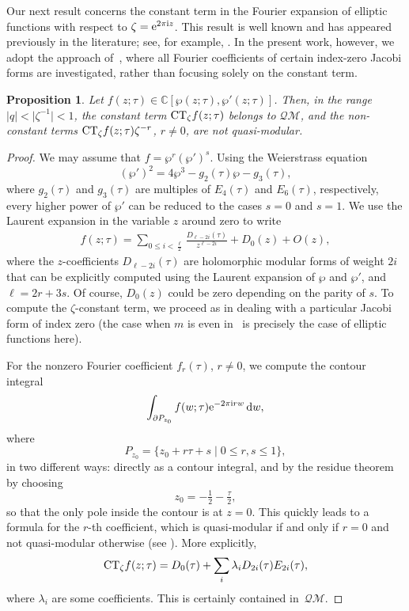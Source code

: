 \documentclass[pdftex]{sigma}
\numberwithin{equation}{section}
\newtheorem{Proposition}[Theorem]{Proposition}
\theoremstyle{definition}
\begin{document}
Our next result concerns the constant term in the Fourier expansion of elliptic functions with respect to $\zeta = {\rm e}^{2\pi {\rm i} z}$.
This result is well known and has appeared previously in the literature; see, for example, \cite{GM, MP}.
In the present work, however, we adopt the approach of~\cite{BFM}, where all Fourier coefficients of certain index-zero Jacobi forms are investigated, rather than focusing solely on the constant term.
\begin{Proposition} \label{elliptic} Let $f(z;\tau) \in \mathbb{C}[\wp(z;\tau),\wp'(z;\tau)]$.
Then, in the range $ |q|< \bigl|\zeta^{-1}\bigr|<1$, the constant term ${\rm CT}_\zeta f(z;\tau)$ belongs to $\mathcal{QM}$, and the non-constant terms ${\rm CT}_\zeta f(z;\tau)\zeta^{-r}$, $r \neq 0$, are not quasi-modular.
\end{Proposition}
\begin{proof} We may assume that $f=\wp^r (\wp')^s$. Using the Weierstrass equation
\[
(\wp')^2=4\wp^3-g_2(\tau)\wp-g_3(\tau),
\]
where $g_2(\tau)$ and $g_3(\tau)$ are multiples of $E_4(\tau)$ and $E_6(\tau)$, respectively, every higher power of $\wp'$ can be reduced to the cases $s=0$ and $s=1$.
We use the Laurent expansion in the variable $z$ around zero to write
\begin{align*} %
f(z;\tau)=\sum_{0 \leq i < \frac{\ell}{2}} \frac{D_{\ell-2i}(\tau)}{ z^{\ell-2i}}+D_0(z)+O(z),
\end{align*}
where the $z$-coefficients $D_{\ell-2i}(\tau)$ are holomorphic {modular} forms of weight $2i$ that can be explicitly computed using the Laurent expansion of $\wp$
and $\wp'$, and $\ell=2r+3s$. Of course, $D_0(z)$ could be zero depending on the parity of $s$. To compute the $\zeta$-constant term, we proceed as in \cite[Theorem~1.1]{BFM} dealing with a particular Jacobi form of index zero (the case when $m$ is even in~\cite{BFM} is precisely the case of elliptic functions here).

For the nonzero Fourier coefficient $f_r(\tau)$, $r \neq 0$, we compute the contour integral
\[
\int_{\partial P_{z_0}} f(w;\tau) {\rm e}^{-2 \pi {\rm i} r w} \, {\rm d}w,
\]
where
\[
P_{z_0} = \{ z_0 + r \tau + s \mid 0 \leq r,s \leq 1 \},
\]
in two different ways: directly as a contour integral, and by the residue theorem by choosing
\[
z_0 = -\tfrac{1}{2} - \tfrac{\tau}{2},
\]
so that the only pole inside the contour is at $z=0$.
This quickly leads to a formula for the $r$-th coefficient, which is quasi-modular if and only if $r=0$ and not quasi-modular otherwise (see \cite[Theorem~1.1]{BFM}).
More explicitly,
\[
{\rm CT}_\zeta f(z;\tau)=D_0(\tau)+\sum_{i} \lambda_i D_{2i}(\tau)E_{2i}(\tau),
\]
where $\lambda_i$ are some coefficients. This is certainly contained in~$\mathcal{QM}$.
\end{proof}
\end{document}
